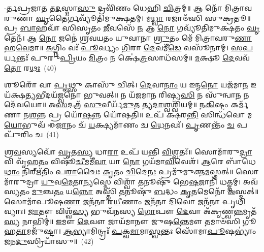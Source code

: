 -𑌰𑍍𑌤𑌪𑍍𑌰𑌜𑌾\-\ul{𑌤} 𑌤\-\ul{𑌦}\-𑌸𑍍𑌮𑌾\-\ul{𑌸𑍁} 𑌦𑍍𑌰𑌵𑌿᳴𑌣𑌂 𑌧𑍇𑌹𑌿 \ul{𑌚𑌿}\-𑌤𑍍𑌰𑌮𑍍॥ 𑌆 𑌨𑍋᳴ 𑌮𑌿𑌤𑍍𑌰𑌾𑌵𑌰𑍁𑌣𑌾 \ul{𑌘𑍃}\-𑌤𑍈𑌰𑍍𑌗𑌵𑍍𑌯𑍂᳴𑌤𑌿𑌮𑍁𑌕𑍍𑌷𑌤𑌮𑍍। 𑌮\-\ul{𑌧𑍍𑌵𑌾} 𑌰𑌜𑌾𑍞᳴𑌸𑌿 𑌸𑍁𑌕𑍍𑌰𑌤𑍂॥ 𑌪𑍍𑌰 \ul{𑌬𑌾}\-𑌹𑌵𑌾᳴ 𑌸𑌿𑌸𑍃𑌤𑌂 \ul{𑌜𑍀}\-𑌵𑌸𑍇᳴ \ul{𑌨} 𑌆 \ul{𑌨𑍋} 𑌗𑌵𑍍𑌯𑍂᳴𑌤𑌿𑌮𑍁𑌕𑍍𑌷𑌤𑌂 \ul{𑌘𑍃}\-𑌤𑍇𑌨᳴। 𑌆 \ul{𑌨𑍋} 𑌜𑌨𑍇॑ 𑌶𑍍𑌰𑌵𑌯𑌤𑌂 𑌯𑍁𑌵𑌾𑌨𑌾 \ul{𑌶𑍍𑌰𑍁}\-𑌤𑌂 𑌮𑍇᳴ 𑌮𑌿𑌤𑍍𑌰𑌾𑌵𑌰𑍁\-\ul{𑌣𑌾} 𑌹\-\ul{𑌵𑍇}\-𑌮𑌾॥ \ul{𑌅}\-𑌗𑍍𑌨𑌿𑌂 𑌵𑌃᳴ \ul{𑌪𑍂}\-𑌰𑍍𑌵𑍍𑌯𑌂 \ul{𑌗𑌿}\-𑌰𑌾 \ul{𑌦𑍇}\-𑌵𑌮𑍀᳴\-\ul{𑌡𑍇} 𑌵𑌸𑍂᳴𑌨𑌾𑌮𑍍। \ul{𑌸}\-\-\ul{𑌪}\-𑌰𑍍𑌯𑌨𑍍𑌤𑌃᳴ 𑌪𑍁𑌰𑍁\-\ul{𑌪𑍍𑌰𑌿}\-𑌯𑌂 \ul{𑌮𑌿}\-𑌤𑍍𑌰𑌂 𑌨 𑌕𑍍𑌷𑍇॑\-\ul{𑌤𑍍𑌰}\-𑌸𑌾𑌧᳴𑌸𑌮𑍍॥ \ul{𑌮}\-𑌕𑍍𑌷𑍂 \ul{𑌦𑍇}\-𑌵𑌵᳴\-\ul{𑌤𑍋} 𑌰\-\ul{𑌥𑌃}\-~(40)

𑌶𑍂𑌰𑍋᳴ 𑌵𑌾 \ul{𑌪𑍃}\-𑌥𑍍𑌸𑍁 𑌕𑌾𑌸𑍁᳴ 𑌚𑌿𑌤𑍍। \ul{𑌦𑍇}\-𑌵𑌾\-\ul{𑌨𑌾𑌂} 𑌯 𑌇𑌨𑍍𑌮\-\ul{𑌨𑍋} 𑌯𑌜᳴𑌮𑌾\-\ul{𑌨} 𑌇𑌯᳴𑌕𑍍𑌷\-\ul{𑌤𑍍𑌯}\-𑌭𑍀𑌦𑌯᳴𑌜𑍍𑌵𑌨𑍋 𑌭𑍁𑌵𑌤𑍍॥ 𑌨 𑌯᳴𑌜𑌮𑌾𑌨 𑌰𑌿𑌷𑍍𑌯\-\ul{𑌸𑌿} 𑌨 𑌸𑍁᳴𑌨𑍍𑌵𑌾\-\ul{𑌨} 𑌨 𑌦𑍇᳴𑌵𑌯𑍋॥ 𑌅\-\ul{𑌸}\-𑌦𑌤𑍍𑌰᳴ \ul{𑌸𑍁}\-𑌵𑍀𑌰𑍍𑌯᳴\-\ul{𑌮𑍁}\-𑌤 𑌤𑍍𑌯\-\ul{𑌦𑌾}\-𑌶𑍍𑌵𑌶𑍍𑌵𑌿᳴𑌯𑌮𑍍॥ 𑌨\-\ul{𑌕𑌿}\-𑌷𑍍𑌟𑌂 𑌕𑌰𑍍𑌮᳴𑌣𑌾 𑌨\-\ul{𑌶}\-𑌨𑍍𑌨 𑌪𑍍𑌰 𑌯𑍋᳴\-\ul{𑌷}\-𑌨𑍍𑌨 𑌯𑍋᳴𑌷𑌤𑌿॥ 𑌉𑌪᳴ 𑌕𑍍𑌷𑌰\-\ul{𑌨𑍍𑌤𑌿} 𑌸𑌿𑌨𑍍𑌧᳴𑌵𑍋 𑌮\-\ul{𑌯𑍋}\-𑌭𑍁𑌵᳴ 𑌈\-\ul{𑌜𑌾}\-𑌨𑌂 𑌚᳴ \ul{𑌯}\-𑌕𑍍𑌷𑍍𑌯𑌮𑌾᳴𑌣𑌂 𑌚 \ul{𑌧𑍇}\-𑌨𑌵𑌃᳴। \ul{𑌪𑍃}\-𑌣𑌨𑍍𑌤𑌂᳴ \ul{𑌚} 𑌪𑌪𑍁᳴𑌰𑌿𑌂 𑌚~(41)

𑌶𑍍𑌰\-\ul{𑌵}\-𑌸𑍍𑌯𑌵𑍋᳴ \ul{𑌘𑍃}\-𑌤\-\ul{𑌸𑍍𑌯} 𑌧𑌾\-\ul{𑌰𑌾} 𑌉𑌪᳴ 𑌯𑌨𑍍𑌤𑌿 \ul{𑌵𑌿}\-𑌶𑍍𑌵𑌤𑌃᳴॥ 𑌸𑍋𑌮𑌾᳴𑌰𑍁\-\ul{𑌦𑍍𑌰𑌾} 𑌵𑌿 𑌵𑍃᳴𑌹\-\ul{𑌤𑌂} 𑌵𑌿𑌷𑍂᳴\-\ul{𑌚𑍀}\-𑌮𑌮𑍀᳴\-\ul{𑌵𑌾} 𑌯𑌾 \ul{𑌨𑍋} 𑌗𑌯᳴𑌮𑌾\-\ul{𑌵𑌿}\-𑌵𑍇𑌶᳴। \ul{𑌆}\-𑌰𑍇 𑌬𑌾᳴𑌧𑍇\-\ul{𑌥𑌾𑌂} 𑌨𑌿𑌰𑍍\mbox{}𑌋᳴𑌤𑌿𑌂 𑌪\-\ul{𑌰𑌾}\-𑌚𑍈𑌃 \ul{𑌕𑍃}\-𑌤𑌂 \ul{𑌚𑌿}\-𑌦𑍇\-\ul{𑌨𑌃} 𑌪𑍍𑌰𑌮𑍁᳴𑌮𑍁𑌕𑍍𑌤\-\ul{𑌮}\-𑌸𑍍𑌮𑌤𑍍॥ 𑌸𑍋𑌮𑌾᳴𑌰𑍁𑌦𑍍𑌰𑌾 \ul{𑌯𑍁}\-𑌵\-\ul{𑌮𑍇}\-𑌤𑌾\-\ul{𑌨𑍍𑌯}\-𑌸𑍍𑌮𑍇 𑌵𑌿𑌶𑍍𑌵𑌾᳴ \ul{𑌤}\-𑌨𑍂𑌷𑍁᳴ 𑌭𑍇\-\ul{𑌷}\-𑌜𑌾𑌨𑌿᳴ 𑌧𑌤𑍍𑌤𑌮𑍍। 𑌅𑌵᳴ 𑌸𑍍𑌯𑌤𑌂 \ul{𑌮𑍁}\-𑌞𑍍𑌚\-\ul{𑌤𑌂} 𑌯\-\ul{𑌨𑍍𑌨𑍋} 𑌅𑌸𑍍𑌤𑌿᳴ \ul{𑌤}\-𑌨𑍂𑌷𑍁᳴ \ul{𑌬}\-𑌦𑍍𑌧𑌂 \ul{𑌕𑍃}\-𑌤𑌮𑍇𑌨𑍋᳴ \ul{𑌅}\-𑌸𑍍𑌮𑌤𑍍॥ 𑌸𑍋𑌮𑌾᳴𑌪𑍂𑌷\-\ul{𑌣𑌾} 𑌜𑌨᳴𑌨𑌾 𑌰\-\ul{𑌯𑍀}\-𑌣𑌾𑌂 𑌜𑌨᳴𑌨𑌾 \ul{𑌦𑌿}\-𑌵𑍋 𑌜𑌨᳴𑌨𑌾 𑌪𑍃\-\ul{𑌥𑌿}\-𑌵𑍍𑌯𑌾𑌃। \ul{𑌜𑌾}\-𑌤𑍗 𑌵𑌿𑌶𑍍𑌵᳴\-\ul{𑌸𑍍𑌯} 𑌭𑍁𑌵᳴𑌨𑌸𑍍𑌯 \ul{𑌗𑍋}\-𑌪𑍗 \ul{𑌦𑍇}\-𑌵𑌾 𑌅᳴𑌕𑍃𑌣𑍍𑌵\-\ul{𑌨𑍍𑌨}\-𑌮𑍃𑌤᳴\-\ul{𑌸𑍍𑌯} 𑌨𑌾𑌭𑌿𑌮𑍍॑॥ \ul{𑌇}\-𑌮𑍗 \ul{𑌦𑍇}\-𑌵𑍗 𑌜𑌾𑌯᳴𑌮𑌾𑌨𑍗 𑌜𑍁𑌷\-\ul{𑌨𑍍𑌤𑍇}\-𑌮𑍗 𑌤𑌮𑌾𑍞᳴𑌸𑌿 𑌗𑍂𑌹\-\ul{𑌤𑌾}\-𑌮𑌜𑍁᳴𑌷𑍍𑌟𑌾। \ul{𑌆}\-𑌭𑍍𑌯𑌾𑌮𑌿𑌨𑍍𑌦𑍍𑌰𑌃᳴ \ul{𑌪}\-𑌕𑍍𑌵\-\ul{𑌮𑌾}\-𑌮𑌾\-\ul{𑌸𑍍𑌵}\-𑌨𑍍𑌤𑌃 𑌸𑍋᳴𑌮𑌾\-\ul{𑌪𑍂}\-𑌷\-𑌭𑍍𑌯𑌾𑌂॑ 𑌜𑌨\-\ul{𑌦𑍁}\-𑌸𑍍𑌰𑌿𑌯𑌾᳴𑌸𑍁॥~(42)

{\anuvakamend[{\-\ul{𑌬𑍃}\-\-\ul{𑌹}\-𑌤𑌃 𑌶𑌵᳴\-\ul{𑌸𑌾} 𑌰\-\ul{𑌥𑌃} 𑌪𑌪𑍁᳴𑌰𑌿𑌂 𑌚 \ul{𑌦𑌿}\-𑌵𑍋 𑌜𑌨᳴\-\ul{𑌨𑌾} 𑌪𑌞𑍍𑌚᳴𑌵𑌿𑍞𑌶𑌤𑌿𑌶𑍍𑌚}]}%
